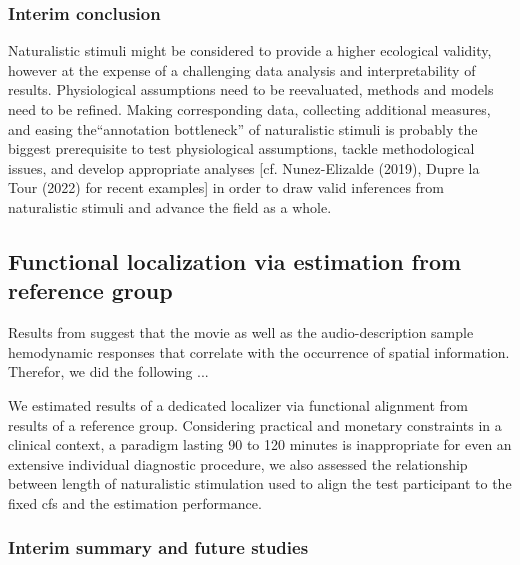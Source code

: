 \subsubsection{Interim conclusion}


%
Naturalistic stimuli might be considered to provide a higher ecological
validity, however at the expense of a challenging data analysis and
interpretability of results.
%
Physiological assumptions need to be reevaluated, methods and models need to be
refined.
%
Making corresponding data, collecting additional measures, and easing
the``annotation bottleneck'' \citep[][p. 16]{aliko2020naturalistic} of
naturalistic stimuli is probably the biggest prerequisite to test physiological
assumptions, tackle methodological issues, and develop appropriate analyses [cf.
Nunez-Elizalde (2019), Dupre la Tour (2022) for recent examples] in order to
draw valid inferences from naturalistic stimuli and advance the field as a
whole.



\subsection{Functional localization via estimation from reference group}



%
Results from \citet{haeusler2022processing} suggest that the movie as well as
the audio-description sample hemodynamic responses that correlate with the
occurrence of spatial information.
%
Therefor, we did the following ...

We estimated results of a dedicated localizer \citep{sengupta2016extension} via
functional alignment from results of a reference group.
Considering practical and monetary constraints in a clinical context, a paradigm
lasting 90 to 120 minutes is inappropriate for even an extensive individual
diagnostic procedure, we also assessed the relationship between length of
naturalistic stimulation used to align the test participant to the fixed
\ac{cfs} and the estimation performance.



\subsubsection{Interim summary and future studies}

